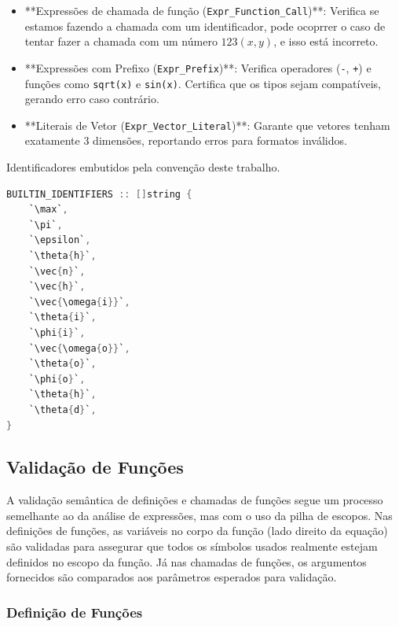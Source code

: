 \begin{itemize}
    \item **Expressões de chamada de função (\verb`Expr_Function_Call`)**: Verifica se estamos fazendo a chamada com um identificador, pode ocoprrer o caso de tentar fazer a chamada com um número $123(x,y)$, e isso está incorreto.
    \item **Expressões com Prefixo (\verb`Expr_Prefix`)**: Verifica operadores (\verb`-`, \verb`+`) e funções como \verb`sqrt(x)` e \verb`sin(x)`. Certifica que os tipos sejam compatíveis, gerando erro caso contrário.
    \item **Literais de Vetor (\verb`Expr_Vector_Literal`)**: Garante que vetores tenham exatamente 3 dimensões, reportando erros para formatos inválidos.
\end{itemize}







\begin{codigo}[htb]
    \caption{\small Identificadores embutidos pela convenção deste trabalho.}
    \label{cod-builtins}
\begin{lstlisting}[language=C, numbers=none, frame=none, inputencoding=latin1]
BUILTIN_IDENTIFIERS :: []string {
    `\max`,
    `\pi`,
    `\epsilon`,
    `\theta{h}`,
    `\vec{n}`,
    `\vec{h}`,
    `\vec{\omega{i}}`,
    `\theta{i}`,
    `\phi{i}`,
    `\vec{\omega{o}}`,
    `\theta{o}`,
    `\phi{o}`,
    `\theta{h}`,
    `\theta{d}`,
}
\end{lstlisting}
\end{codigo}





\subsection{Validação de Funções}
A validação semântica de definições e chamadas de funções segue um processo semelhante ao da análise de expressões, mas com o uso da pilha de escopos.
Nas definições de funções, as variáveis no corpo da função (lado direito da equação) são validadas para assegurar que todos os símbolos usados realmente estejam definidos no escopo da função. Já nas chamadas de funções, os argumentos fornecidos são comparados aos parâmetros esperados para validação.



\subsubsection{Definição de Funções} \label{subsubsection-eq-func-defn}

